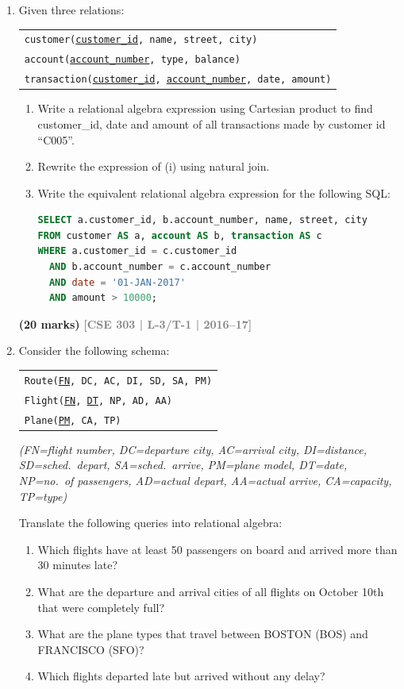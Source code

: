 \documentclass[12pt,a3paper]{article}
\newcommand{\yr}[1]{\hfill\textcolor{gray}{\small\textbf{[#1]}}}
\newcommand{\mk}[1]{\textcolor{orange!70!black}{\small\textbf{(#1 marks)}}}
\begin{document}
\begin{enumerate}
\item Given three relations:
\begin{center}
\begin{tabular}{l}
\texttt{customer(\underline{customer\_id}, name, street, city)}\\
\texttt{account(\underline{account\_number}, type, balance)}\\
\texttt{transaction(\underline{customer\_id}, \underline{account\_number}, date, amount)}
\end{tabular}
\end{center}
\begin{enumerate}
  \item Write a relational algebra expression using Cartesian product to find customer\_id, date and amount of all transactions made by customer id ``C005''.
  \item Rewrite the expression of (i) using natural join.
  \item Write the equivalent relational algebra expression for the following SQL:
\begin{lstlisting}[language=SQL]
SELECT a.customer_id, b.account_number, name, street, city
FROM customer AS a, account AS b, transaction AS c
WHERE a.customer_id = c.customer_id
  AND b.account_number = c.account_number
  AND date = '01-JAN-2017'
  AND amount > 10000;
\end{lstlisting}
\end{enumerate}
\mk{20} \yr{CSE 303 | L-3/T-1 | 2016--17}

\item Consider the following schema:
\begin{center}
\begin{tabular}{l}
\texttt{Route(\underline{FN}, DC, AC, DI, SD, SA, PM)}\\
\texttt{Flight(\underline{FN}, \underline{DT}, NP, AD, AA)}\\
\texttt{Plane(\underline{PM}, CA, TP)}
\end{tabular}
\end{center}
\textit{(FN=flight number, DC=departure city, AC=arrival city, DI=distance, SD=sched.\ depart, SA=sched.\ arrive, PM=plane model, DT=date, NP=no.\ of passengers, AD=actual depart, AA=actual arrive, CA=capacity, TP=type)}

Translate the following queries into relational algebra:
\begin{enumerate}
  \item Which flights have at least 50 passengers on board and arrived more than 30 minutes late?
  \item What are the departure and arrival cities of all flights on October 10th that were completely full?
  \item What are the plane types that travel between BOSTON (BOS) and FRANCISCO (SFO)?
  \item Which flights departed late but arrived without any delay?
\end{enumerate}



\end{enumerate}
\end{document}
